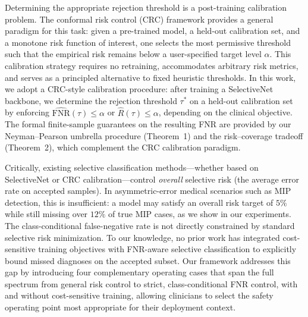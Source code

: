   Determining the appropriate rejection threshold is a post-training calibration problem. The conformal risk control (CRC) framework \cite{angelopoulos2022conformal, bates2021distribution} provides a general
   paradigm for this task: given a pre-trained model, a held-out calibration set, and a monotone risk function of interest, one selects the most permissive threshold such that the empirical risk remains
  below a user-specified target level $\alpha$. This calibration strategy requires no retraining, accommodates arbitrary risk metrics, and serves as a principled alternative to fixed heuristic thresholds. In
   this work, we adopt a CRC-style calibration procedure: after training a SelectiveNet backbone, we determine the rejection threshold $\tau^*$ on a held-out calibration set by enforcing
  $\widehat{\mathrm{FNR}}(\tau) \leq \alpha$ or $\hat{R}(\tau) \leq \alpha$, depending on the clinical objective. The formal finite-sample guarantees on the resulting FNR are provided by our Neyman--Pearson
  umbrella procedure (Theorem~1) and the risk--coverage tradeoff (Theorem~2), which complement the CRC calibration paradigm.

  Critically, existing selective classification methods---whether based on SelectiveNet or CRC calibration---control \emph{overall} selective risk (the average error rate on accepted samples). In            
  asymmetric-error medical scenarios such as MIP detection, this is insufficient: a model may satisfy an overall risk target of $5\%$ while still missing over $12\%$ of true MIP cases, as we show in our
  experiments. The class-conditional false-negative rate is not directly constrained by standard selective risk minimization. To our knowledge, no prior work has integrated cost-sensitive training objectives
   with FNR-aware selective classification to explicitly bound missed diagnoses on the accepted subset. Our framework addresses this gap by introducing four complementary operating cases that span the full
  spectrum from general risk control to strict, class-conditional FNR control, with and without cost-sensitive training, allowing clinicians to select the safety operating point most appropriate for their
  deployment context.
